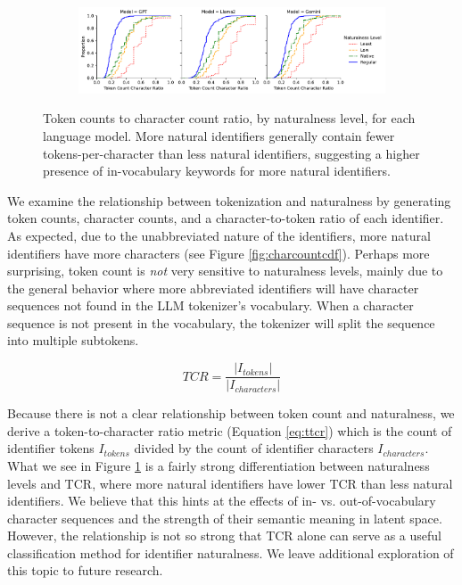 \begin{figure}[ht]
  \centering
  \begin{subfigure}{\textwidth}
    \centering
    \includegraphics[width=\textwidth]{figures/identifier-token-char-ratio-cdf.pdf}
  \end{subfigure}
  \caption{Token counts to character count ratio, by naturalness level, for each language model. More natural identifiers generally contain fewer tokens-per-character than less natural identifiers, suggesting a higher presence of in-vocabulary keywords for more natural identifiers.}
  \label{fig:tokencdfs}
\end{figure}

We examine the relationship between tokenization and naturalness by generating token counts, character counts, and a character-to-token ratio of each identifier.
As expected, due to the unabbreviated nature of the identifiers, more natural identifiers have more characters (see Figure \ref{fig:charcountcdf}). 
Perhaps more surprising, token count is \emph{not} very sensitive to naturalness levels, mainly due to the general behavior where more abbreviated identifiers will have character sequences not found in the LLM tokenizer's vocabulary.
When a character sequence is not present in the vocabulary, the tokenizer will split the sequence into multiple subtokens.

\begin{equation}
  \label{eq:ttcr}
  TCR = \frac{|I_{tokens}|}{|I_{characters}|}
\end{equation}

Because there is not a clear relationship between token count and naturalness, we derive a token-to-character ratio metric (Equation \ref{eq:ttcr}) which is the count of identifier tokens $I_{tokens}$ divided by the count of identifier characters $I_{characters}$.
What we see in Figure \ref{fig:tokencdfs} is a fairly strong differentiation between naturalness levels and TCR, where more natural identifiers have lower TCR than less natural identifiers.
We believe that this hints at the effects of in- vs. out-of-vocabulary character sequences and the strength of their semantic meaning in latent space.
However, the relationship is not so strong that TCR alone can serve as a useful classification method for identifier naturalness.
We leave additional exploration of this topic to future research.



